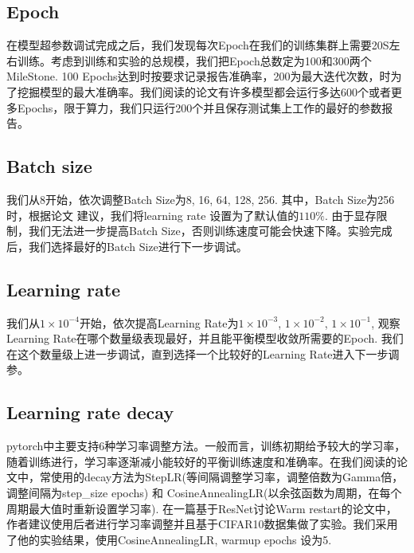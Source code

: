 \documentclass[hyperref, UTF8, 12pt]{article}
\theoremstyle{definition}
\begin{document}
\subsection{Epoch}
在模型超参数调试完成之后，我们发现每次Epoch在我们的训练集群上需要20S左右训练。考虑到训练和实验的总规模，我们把Epoch总数定为100和300两个MileStone. 100 Epochs达到时按要求记录报告准确率，200为最大迭代次数，时为了挖掘模型的最大准确率。我们阅读的论文有许多模型都会运行多达600个或者更多Epochs，限于算力，我们只运行200个并且保存测试集上工作的最好的参数报告。

\subsection{Batch size}
我们从8开始，依次调整Batch Size为8, 16, 64, 128, 256. 其中，Batch Size为256时，根据论文\cite{he2015deep} 建议，我们将learning rate 设置为了默认值的$110\%$. 由于显存限制，我们无法进一步提高Batch Size，否则训练速度可能会快速下降。实验完成后，我们选择最好的Batch Size进行下一步调试。

\subsection{Learning rate}
我们从$1 \times 10^{-4}$开始，依次提高Learning Rate为$1 \times 10^{-3}$, $1 \times 10^{-2}$, $1 \times 10^{-1}$, 观察Learning Rate在哪个数量级表现最好，并且能平衡模型收敛所需要的Epoch. 我们在这个数量级上进一步调试，直到选择一个比较好的Learning Rate进入下一步调参。

\subsection{Learning rate decay}
pytorch中主要支持6种学习率调整方法。一般而言，训练初期给予较大的学习率，随着训练进行，学习率逐渐减小能较好的平衡训练速度和准确率。在我们阅读的论文中，常使用的decay方法为StepLR(等间隔调整学习率，调整倍数为Gamma倍，调整间隔为step\_size epochs) 和 CosineAnnealingLR(以余弦函数为周期，在每个周期最大值时重新设置学习率). 在一篇基于ResNet讨论Warm restart的论文中\cite{loshchilov2017sgdr}，作者建议使用后者进行学习率调整并且基于CIFAR10数据集做了实验。我们采用了他的实验结果，使用CosineAnnealingLR, warmup epochs 设为5.
\end{document}

